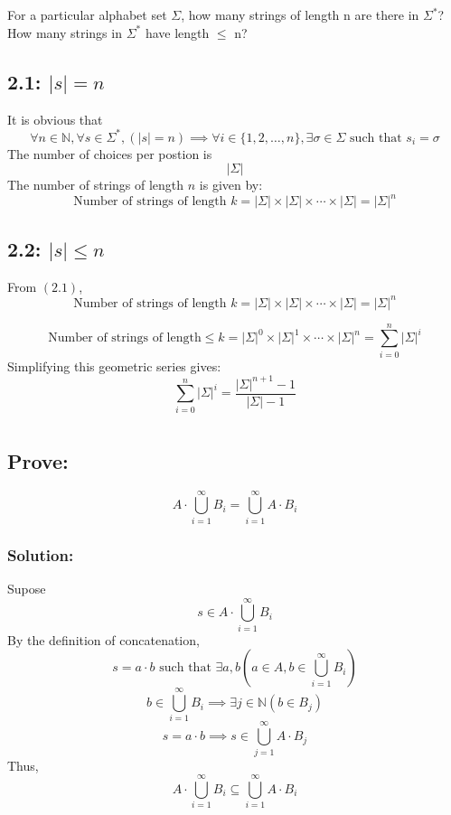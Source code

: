 \documentclass[12pt]{article}
\begin{document}
\section{}
For a particular alphabet set \(\Sigma\), how many strings of length n are there in \(\Sigma^*\)? 
How many strings in \(\Sigma^*\) have length \(\leq\) n?

\subsection*{2.1: \(|s| = n\)}
It is obvious that 
\[
\forall n \in \mathbb{N}, \forall s \in \Sigma^*, (|s| = n) \implies \forall i \in \{1, 2, \dots, n\}, \exists \sigma \in \Sigma \text{ such that } s_i = \sigma
\]
The number of choices per postion is 
\[|\Sigma|\]
The number of strings of length \( n \) is given by:
\[
\text{Number of strings of length } k = |\Sigma| \times |\Sigma| \times \cdots \times |\Sigma| = |\Sigma|^n
\]

\subsection*{2.2: \(|s| \leq n\)}
From \((2.1)\), 
\[
\text{Number of strings of length } k = |\Sigma| \times |\Sigma| \times \cdots \times |\Sigma| = |\Sigma|^n
\]

\[
\text{Number of strings of length} \leq k = |\Sigma|^0 \times |\Sigma|^1 \times \cdots \times |\Sigma|^n = \sum_{i=0}^{n}|\Sigma|^i
\]
Simplifying this geometric series gives:
\[\sum_{i=0}^{n}|\Sigma|^i = \frac{|\Sigma|^{n+1}-1}{|\Sigma|-1}\]


\section{}
\subsection*{Prove:}
\[
A\cdot\bigcup\limits_{i=1}^{\infty} B_i=\bigcup\limits_{i=1}^{\infty}A\cdot B_i
\]
\subsubsection*{Solution:}
Supose 
\[s\in A\cdot\bigcup\limits_{i=1}^{\infty} B_i\]
By the definition of concatenation,
\[s = a \cdot b \text{ such that }\exists a, b (a \in A, b\in\bigcup\limits_{i=1}^{\infty} B_i )\]
\[b\in\bigcup\limits_{i=1}^{\infty} B_i \implies\exists j \in \mathbb{N}(b \in B_j)\]
\[s = a \cdot b \implies s \in \bigcup\limits_{j=1}^{\infty}A\cdot B_j\]
Thus,
\[
A\cdot\bigcup\limits_{i=1}^{\infty} B_i \subseteq \bigcup\limits_{i=1}^{\infty}A\cdot B_i
\]
\end{document}
